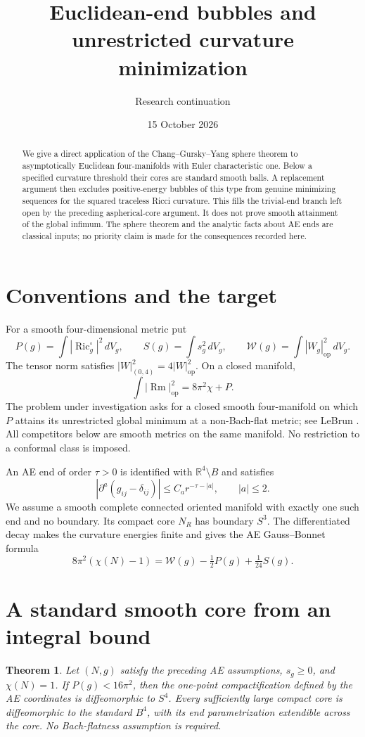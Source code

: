\documentclass[11pt]{article}
\title{Euclidean-end bubbles and unrestricted curvature minimization}
\author{Research continuation}
\date{15 October 2026}
\newtheorem{theorem}{Theorem}
\newcommand{\Ric}{\operatorname{Ric}}
\newcommand{\R}{\mathbb R}
\newcommand{\W}{\mathcal W}
\begin{document}
\maketitle
\begin{abstract}
We give a direct application of the Chang--Gursky--Yang sphere theorem to
asymptotically Euclidean four-manifolds with Euler characteristic one.
Below a specified curvature threshold their cores are standard smooth balls.
A replacement argument then excludes positive-energy bubbles of this type
from genuine minimizing sequences for the squared traceless Ricci curvature.
This fills the trivial-end branch left open by the preceding aspherical-core
argument. It does not prove smooth attainment of the global infimum.
The sphere theorem and the analytic facts about AE ends are classical inputs;
no priority claim is made for the consequences recorded here.
\end{abstract}

\section{Conventions and the target}
For a smooth four-dimensional metric put
\[
 P(g)=\int|\Ric_g^\circ|^2\,dV_g,\qquad
 S(g)=\int s_g^2\,dV_g,\qquad
 \W(g)=\int|W_g|_{\mathrm{op}}^2\,dV_g.
\]
The tensor norm satisfies $|W|_{(0,4)}^2=4|W|_{\mathrm{op}}^2$.
On a closed manifold,
\[
 \int|\operatorname{Rm}|_{\mathrm{op}}^2=8\pi^2\chi+P.
\]
The problem under investigation asks for a closed smooth four-manifold on
which $P$ attains its unrestricted global minimum at a non-Bach-flat metric;
see LeBrun \cite[Section 11]{LeBrun}. All competitors below are smooth
metrics on the same manifold. No restriction to a conformal class is imposed.

An AE end of order $\tau>0$ is identified with $\R^4\setminus B$ and satisfies
\[
 |\partial^a(g_{ij}-\delta_{ij})|\le C_a r^{-\tau-|a|},
 \qquad |a|\le2.
\]
We assume a smooth complete connected oriented manifold with exactly one
such end and no boundary. Its compact core $N_R$ has boundary $S^3$.
The differentiated decay makes the curvature energies finite and gives
the AE Gauss--Bonnet formula
\begin{equation}\label{gb}
 8\pi^2(\chi(N)-1)=\W(g)-\tfrac12P(g)+\tfrac1{24}S(g).
\end{equation}

\section{A standard smooth core from an integral bound}
\begin{theorem}\label{standard}
Let $(N,g)$ satisfy the preceding AE assumptions, $s_g\ge0$, and
$\chi(N)=1$. If $P(g)<16\pi^2$, then the one-point compactification
defined by the AE coordinates is diffeomorphic to $S^4$.
Every sufficiently large compact core is diffeomorphic to the standard
$B^4$, with its end parametrization extendible across the core.
No Bach-flatness assumption is required.
\end{theorem}
\end{document}
